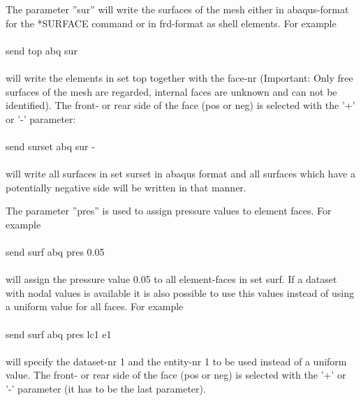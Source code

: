 \documentclass{article}
\begin{document}
The parameter ''sur'' will write the surfaces of the mesh either in abaqus-format for the *SURFACE command or in frd-format as shell elements. For example\\\\send top abq sur\\\\will write the elements in set top together with the face-nr (Important: Only free surfaces of the mesh are regarded, internal faces are unknown and can not be identified). The front- or rear side of the face (pos or neg) is selected with the '+' or '-' parameter:\\\\send surset abq sur -\\\\will write all surfaces in set surset in abaqus format and all surfaces which have a potentially negative side will be written in that manner. 

The parameter ''pres'' is used to assign pressure values to element faces. For example\\\\send surf abq pres 0.05\\\\will assign the pressure value 0.05 to all element-faces in set surf. If a dataset with nodal values is available it is also possible to use this values instead of using a uniform value for all faces. For example\\\\send surf abq pres lc1 e1\\\\will specify the dataset-nr 1 and the entity-nr 1 to be used instead of a uniform value. The front- or rear side of the face (pos or neg) is selected with the '+' or '-' parameter (it has to be the last parameter).
\end{document}
